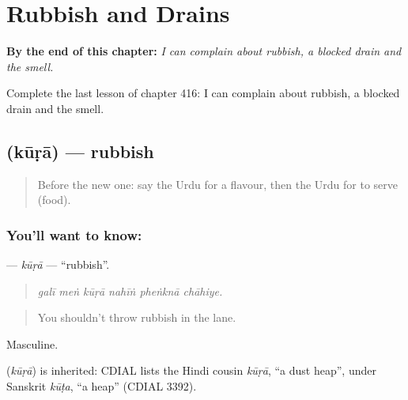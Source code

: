 
\chapter{Rubbish and Drains}
\label{ch:ur-rubbish-and-drains}

\begin{chapteropening}
\textbf{By the end of this chapter:} \emph{I can complain about rubbish, a blocked drain and the smell.}

Complete the last lesson of chapter 416: I can complain about rubbish, a blocked drain and the smell.
\end{chapteropening}

\section[\texorpdfstring{\ur{کوڑا} (kūṛā)}{کوڑا (kūṛā)}]{ (kūṛā) — rubbish}

\label{lesson:UR-C416-kura}



\begin{quote}
Before the new one: say the Urdu for a flavour, then the Urdu for to serve (food).
\end{quote}

\subsection*{You'll want to know: }
\textbf{} — \emph{kūṛā} — \textquotedblleft{}rubbish\textquotedblright{}.

\begin{quote}
     
\end{quote}

\begin{quote}
\emph{galī meṅ kūṛā nahīṅ pheṅknā chāhiye.}
\end{quote}

\begin{quote}
You shouldn't throw rubbish in the lane.
\end{quote}

Masculine.

\begin{cousinweb}
\textbf{} (\emph{kūṛā}) is inherited: CDIAL lists the Hindi cousin \emph{kūṛā}, \textquotedblleft{}a dust heap\textquotedblright{}, under Sanskrit \emph{kūṭa}, \textquotedblleft{}a heap\textquotedblright{} (CDIAL 3392).
\end{cousinweb}

